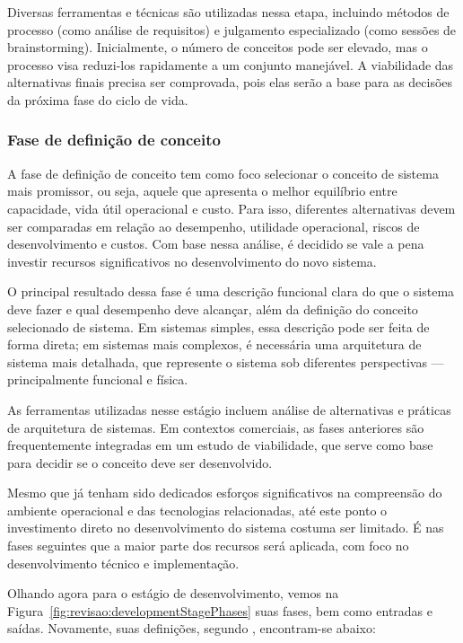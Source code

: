 	Diversas ferramentas e técnicas são utilizadas nessa etapa, incluindo métodos de processo (como análise de requisitos) e julgamento especializado 
	(como sessões de brainstorming). Inicialmente, o número de conceitos pode ser elevado, mas o processo visa reduzi-los 
	rapidamente a um conjunto manejável. A viabilidade das alternativas finais precisa ser comprovada, pois elas serão a base para as decisões da próxima fase do 
	ciclo de vida.

	\subsubsection*{Fase de definição de conceito}

	A fase de definição de conceito tem como foco selecionar o conceito de sistema mais promissor, ou seja, aquele que apresenta o melhor equilíbrio entre 
	capacidade, vida útil operacional e custo. Para isso, diferentes alternativas devem ser comparadas em relação ao desempenho, utilidade operacional, riscos 
	de desenvolvimento e custos. Com base nessa análise, é decidido se vale a pena investir recursos significativos no desenvolvimento do novo sistema.

	O principal resultado dessa fase é uma descrição funcional clara do que o sistema deve fazer e qual desempenho deve alcançar, além da definição do conceito 
	selecionado de sistema. Em sistemas simples, essa descrição pode ser feita de forma direta; em sistemas mais complexos, é necessária uma arquitetura de sistema 
	mais detalhada, que represente o sistema sob diferentes perspectivas — principalmente funcional e física.

	As ferramentas utilizadas nesse estágio incluem análise de alternativas e práticas de arquitetura de sistemas. Em contextos comerciais, as 
	fases anteriores são frequentemente integradas em um estudo de viabilidade, que serve como base para decidir se o conceito deve ser desenvolvido.

	Mesmo que já tenham sido dedicados esforços significativos na compreensão do ambiente operacional e das tecnologias relacionadas, até este ponto o 
	investimento direto no desenvolvimento do sistema costuma ser limitado. É nas fases seguintes que a maior parte dos recursos será aplicada, com foco no 
	desenvolvimento técnico e implementação.

	Olhando agora para o estágio de desenvolvimento, vemos na Figura~\ref{fig:revisao:developmentStagePhases} suas fases, bem como entradas e saídas. Novamente, suas definições, segundo \cite{kossiakoff2020systems}, encontram-se abaixo:

